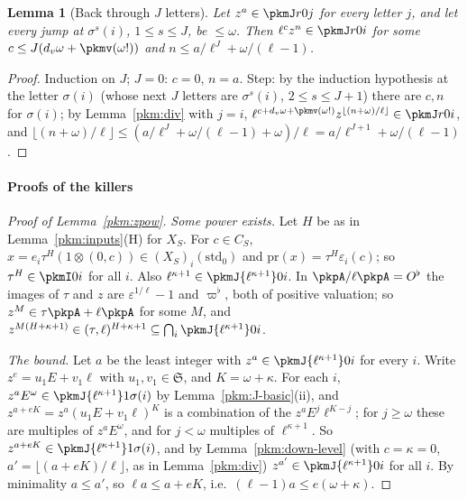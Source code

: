 \documentclass[10pt]{amsart}
\newtheorem{lemma}[theorem]{Lemma}
\theoremstyle{definition}
\theoremstyle{remark}
\begin{document}
\begin{lemma}[Back through $J$ letters]\label{pkm:back}
Let $z^a\in\pkmJ r0j$ for every letter $j$, and let every jump at $\sigma^s(i)$, $1\le s\le J$, be
$\le\omega$. Then $\ell^cz^n\in\pkmJ r0i$ for some $c\le J(d_v\omega+\pkmv(\omega!))$ and $n\le
a/\ell^J+\omega/(\ell-1)$.
\end{lemma}

\begin{proof}
Induction on $J$; $J=0$: $c=0$, $n=a$. Step: by the induction hypothesis at the letter $\sigma(i)$
(whose next $J$ letters are $\sigma^s(i)$, $2\le s\le J+1$) there are $c,n$ for $\sigma(i)$; by
Lemma~\ref{pkm:div} with $j=i$, $\ell^{c+d_v\omega+\pkmv(\omega!)}z^{\lfloor(n+\omega)/\ell\rfloor}\in\pkmJ
r0i$, and $\lfloor(n+\omega)/\ell\rfloor\le(a/\ell^J+\omega/(\ell-1)+\omega)/\ell=a/\ell^{J+1}+
\omega/(\ell-1)$.
\end{proof}

\paragraph*{Proofs of the killers}

\begin{proof}[Proof of Lemma~\ref{pkm:zpow}]
\emph{Some power exists.} Let $H$ be as in Lemma~\ref{pkm:inputs}(H) for $X_S$. For $c\in C_S$,
$x=e_i\tau^H(1\otimes(0,c))\in(X_S)_i(\mathrm{std}_0)$ and $\mathrm{pr}(x)=\tau^H\varepsilon_i(c)$; so
$\tau^H\in\pkmI0i$ for all $i$. Also $\ell^{\kappa+1}\in\pkmJ{\ell^{\kappa+1}}0i$. In $\pkpA/\ell\pkpA=
O^\flat$ the images of $\tau$ and $z$ are $\varepsilon^{1/\ell}-1$ and $\varpi^\flat$, both of positive
valuation; so $z^M\in\tau\pkpA+\ell\pkpA$ for some $M$, and $z^{M(H+\kappa+1)}\in(\tau,\ell)^{H+\kappa+1}
\subseteq\bigcap_i\pkmJ{\ell^{\kappa+1}}0i$.

\emph{The bound.} Let $a$ be the least integer with $z^a\in\pkmJ{\ell^{\kappa+1}}0i$ for every $i$. Write
$z^e=u_1E+v_1\ell$ with $u_1,v_1\in\mathfrak S$, and $K=\omega+\kappa$. For each $i$,
$z^aE^\omega\in\pkmJ{\ell^{\kappa+1}}1{\sigma(i)}$ by Lemma~\ref{pkm:J-basic}(ii), and
$z^{a+eK}=z^a(u_1E+v_1\ell)^K$ is a combination of the $z^aE^j\ell^{K-j}$; for $j\ge\omega$ these are
multiples of $z^aE^\omega$, and for $j<\omega$ multiples of $\ell^{\kappa+1}$. So $z^{a+eK}\in\pkmJ
{\ell^{\kappa+1}}1{\sigma(i)}$, and by Lemma~\ref{pkm:down-level} (with $c=\kappa=0$, $a'=\lfloor(a+eK)/\ell
\rfloor$, as in Lemma~\ref{pkm:div}) $z^{a'}\in\pkmJ{\ell^{\kappa+1}}0i$ for all $i$. By minimality $a\le a'$,
so $\ell a\le a+eK$, i.e.\ $(\ell-1)a\le e(\omega+\kappa)$.
\end{proof}
\end{document}
